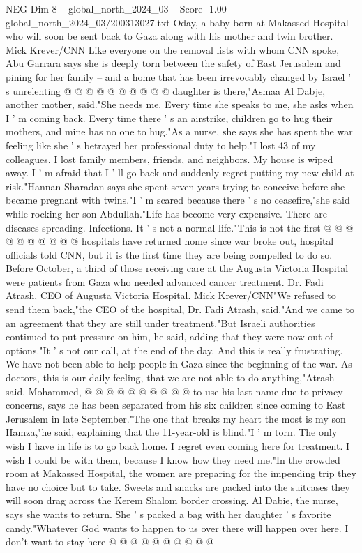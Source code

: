 \begin{textsample}{NEG Dim 8 – global\_north\_2024\_03 – Score -1.00 – global\_north\_2024\_03/200313027.txt}
Oday, a baby born at Makassed Hospital who will soon be sent back to Gaza along with his mother and twin brother.
Mick Krever/CNN Like everyone on the removal lists with whom CNN spoke, Abu Garrara says she is deeply torn between the safety of East Jerusalem and pining for her family -- and a home that has been irrevocably changed by Israel ' s unrelenting @ @ @ @ @ @ @ @ @ @ daughter is there,"Asmaa Al Dabje, another mother, said."She needs me.
Every time she speaks to me, she asks when I ' m coming back.
Every time there ' s an airstrike, children go to hug their mothers, and mine has no one to hug."As a nurse, she says she has spent the war feeling like she ' s betrayed her professional duty to help."I lost 43 of my colleagues.
I lost family members, friends, and neighbors.
My house is wiped away.
I ' m afraid that I ' ll go back and suddenly regret putting my new child at risk."Hannan Sharadan says she spent seven years trying to conceive before she became pregnant with twins."I ' m scared because there ' s no ceasefire,"she said while rocking her son Abdullah."Life has become very expensive.
There are diseases spreading.
Infections.
It ' s not a normal life."This is not the first @ @ @ @ @ @ @ @ @ @ hospitals have returned home since war broke out, hospital officials told CNN, but it is the first time they are being compelled to do so.
Before October, a third of those receiving care at the Augusta Victoria Hospital were patients from Gaza who needed advanced cancer treatment.
Dr.
Fadi Atrash, CEO of Augusta Victoria Hospital.
Mick Krever/CNN"We refused to send them back,"the CEO of the hospital, Dr.
Fadi Atrash, said."And we came to an agreement that they are still under treatment."But Israeli authorities continued to put pressure on him, he said, adding that they were now out of options."It ' s not our call, at the end of the day.
And this is really frustrating.
We have not been able to help people in Gaza since the beginning of the war.
As doctors, this is our daily feeling, that we are not able to do anything,"Atrash said.
Mohammed, @ @ @ @ @ @ @ @ @ @ to use his last name due to privacy concerns, says he has been separated from his six children since coming to East Jerusalem in late September."The one that breaks my heart the most is my son Hamza,"he said, explaining that the 11-year-old is blind."I ' m torn.
The only wish I have in life is to go back home.
I regret even coming here for treatment.
I wish I could be with them, because I know how they need me."In the crowded room at Makassed Hospital, the women are preparing for the impending trip they have no choice but to take.
Sweets and snacks are packed into the suitcases they will soon drag across the Kerem Shalom border crossing.
Al Dabie, the nurse, says she wants to return.
She ' s packed a bag with her daughter ' s favorite candy."Whatever God wants to happen to us over there will happen over here.
I don't want to stay here @ @ @ @ @ @ @ @ @ @

\end{textsample}
